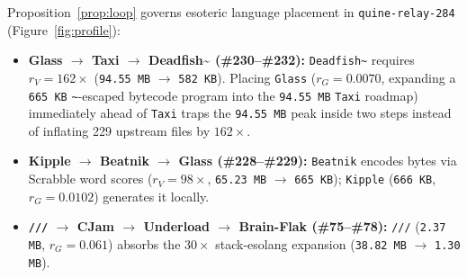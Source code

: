 \documentclass[10pt,twocolumn]{article}
\theoremstyle{definition}
\begin{document}
Proposition~\ref{prop:loop} governs esoteric language placement in \texttt{quine-relay-284} (Figure~\ref{fig:profile}):
\begin{itemize}
  \item \textbf{Glass $\to$ Taxi $\to$ Deadfish\textasciitilde{} (\#230--\#232):} \texttt{Deadfish\textasciitilde} requires $r_V = 162\times$ (\texttt{94.55 MB} $\to$ \texttt{582 KB}). Placing \texttt{Glass} ($r_G = 0.0070$, expanding a \texttt{665 KB} \texttt{\textasciitilde}-escaped bytecode program into the \texttt{94.55 MB} \texttt{Taxi} roadmap) immediately ahead of \texttt{Taxi} traps the \texttt{94.55 MB} peak inside two steps instead of inflating 229 upstream files by $162\times$.
  \item \textbf{Kipple $\to$ Beatnik $\to$ Glass (\#228--\#229):} \texttt{Beatnik} encodes bytes via Scrabble word scores ($r_V = 98\times$, \texttt{65.23 MB} $\to$ \texttt{665 KB}); \texttt{Kipple} (\texttt{666 KB}, $r_G = 0.0102$) generates it locally.
  \item \textbf{\texttt{///} $\to$ CJam $\to$ Underload $\to$ Brain-Flak (\#75--\#78):} \texttt{///} (\texttt{2.37 MB}, $r_G = 0.061$) absorbs the $30\times$ stack-esolang expansion (\texttt{38.82 MB} $\to$ \texttt{1.30 MB}).
\end{itemize}
\end{document}
